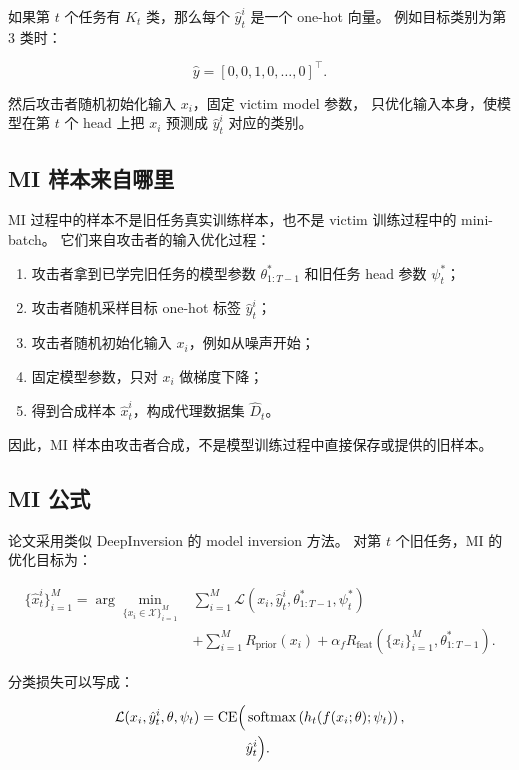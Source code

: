 \documentclass[11pt]{article}
\begin{document}
如果第 \(t\) 个任务有 \(K_t\) 类，那么每个 \(\hat{y}_t^i\) 是一个 one-hot 向量。
例如目标类别为第 3 类时：

\[
\hat{y}
=
[0,0,1,0,\ldots,0]^\top.
\]

然后攻击者随机初始化输入 \(x_i\)，固定 victim model 参数，
只优化输入本身，使模型在第 \(t\) 个 head 上把 \(x_i\) 预测成
\(\hat{y}_t^i\) 对应的类别。

\subsection{MI 样本来自哪里}

MI 过程中的样本不是旧任务真实训练样本，也不是 victim 训练过程中的 mini-batch。
它们来自攻击者的输入优化过程：

\begin{enumerate}
  \item 攻击者拿到已学完旧任务的模型参数
  \(\theta_{1:T-1}^{*}\) 和旧任务 head 参数 \(\psi_t^{*}\)；
  \item 攻击者随机采样目标 one-hot 标签 \(\hat{y}_t^i\)；
  \item 攻击者随机初始化输入 \(x_i\)，例如从噪声开始；
  \item 固定模型参数，只对 \(x_i\) 做梯度下降；
  \item 得到合成样本 \(\hat{x}_t^i\)，构成代理数据集 \(\hat{D}_t\)。
\end{enumerate}

因此，MI 样本由攻击者合成，不是模型训练过程中直接保存或提供的旧样本。

\subsection{MI 公式}

论文采用类似 DeepInversion 的 model inversion 方法。
对第 \(t\) 个旧任务，MI 的优化目标为：

\[
\begin{aligned}
\{\hat{x}_t^i\}_{i=1}^{M}
=
\arg\min_{\{x_i\in\mathcal{X}\}_{i=1}^{M}}
&
\sum_{i=1}^{M}
\mathcal{L}(x_i,\hat{y}_t^i,\theta_{1:T-1}^{*},\psi_t^{*}) \\
&+
\sum_{i=1}^{M}R_{\mathrm{prior}}(x_i)
+
\alpha_f
R_{\mathrm{feat}}(\{x_i\}_{i=1}^{M},\theta_{1:T-1}^{*}).
\end{aligned}
\]

分类损失可以写成：

\[
\begin{aligned}
\mathcal{L}(x_i,\hat{y}_t^i,\theta,\psi_t)
=
\operatorname{CE}
\Bigl(
&\operatorname{softmax}
\left(
h_t(f(x_i;\theta);\psi_t)
\right), \\
&\hat{y}_t^i
\Bigr).
\end{aligned}
\]
\end{document}
